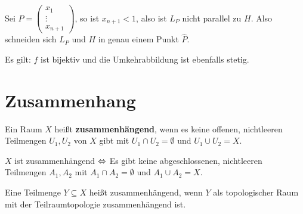 \begin{beispiel}
    Sei $P = \begin{pmatrix}x_1\\ \vdots \\ x_{n+1}\end{pmatrix}$, so
    ist $x_{n+1} < 1$, also ist $L_P$ nicht parallel zu $H$. Also
    schneiden sich $L_P$ und $H$ in genau einem Punkt $\hat{P}$.

    Es gilt: $f$ ist bijektiv und die Umkehrabbildung ist ebenfalls
    stetig.    
\end{beispiel}

\section{Zusammenhang}
\begin{definition}
    Ein Raum $X$ heißt \textbf{zusammenhängend}, wenn es keine offenen,
    nichtleeren Teilmengen $U_1, U_2$ von $X$ gibt mit 
    $U_1 \cap U_2 = \emptyset$ und $U_1 \cup U_2 = X$.
\end{definition}

\begin{bemerkung}
    $X$ ist zusammenhängend $\Leftrightarrow$ Es gibt keine abgeschlossenen,
    nichtleeren Teilmengen $A_1, A_2$ mit $A_1 \cap A_2 = \emptyset$ 
    und $A_1 \cup A_2 = X$.
\end{bemerkung}

\begin{bemerkung}
    Eine Teilmenge $Y \subseteq X$ heißt zusammenhängend, wenn $Y$
    als topologischer Raum mit der Teilraumtopologie zusammenhängend ist.
\end{bemerkung}

%

